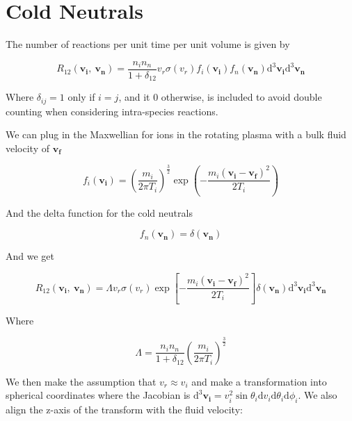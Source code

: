 \documentclass[11pt]{article}
\begin{document}
\section{Cold Neutrals}

The number of reactions per unit time per unit volume is given by 

\begin{equation}
	R_{12} (\mathbf{v_i},\ \mathbf{v_n}) = \frac{n_i n_n}{1 + \delta_{12}} v_r \sigma(v_r) f_i(\mathbf{v_i}) f_n(\mathbf{v_n}) \mathrm{d}^3 \mathbf{v_i} \mathrm{d}^3 \mathbf{v_n}
\end{equation}

Where $\delta_{ij} = 1$ only if $i = j$, and it 0 otherwise, is included to avoid double counting when considering intra-species reactions.

We can plug in the Maxwellian for ions in the rotating plasma with a bulk fluid velocity of $\mathbf{v_f}$

\begin{equation}
	f_i(\mathbf{v_i}) = \left( \frac{m_i}{2 \pi T_i} \right)^{\frac{3}{2}} \exp \left( -\frac{m_i (\mathbf{v_i} - \mathbf{v_f})^2}{2 T_i} \right)  
\end{equation}

And the delta function for the cold neutrals

\begin{equation}
	f_n(\mathbf{v_n}) = \delta( \mathbf{v_n} )
\end{equation}

And we get 

\begin{equation}
	R_{12} (\mathbf{v_i},\ \mathbf{v_n}) = \Lambda v_r \sigma(v_r) \exp \left[ - \frac{m_i (\mathbf{v_i} - \mathbf{v_f})^2}{2 T_i} \right] \delta( \mathbf{v_n} ) \mathrm{d}^3 \mathbf{v_i} \mathrm{d}^3 \mathbf{v_n}
\end{equation}

Where

\begin{equation}
	\Lambda = \frac{n_i n_n}{1 + \delta_{12}} \left( \frac{m_i}{2 \pi T_i} \right)^{\frac{3}{2}} 
\end{equation}

We then make the assumption that $v_r \approx v_i$ and make a transformation into spherical coordinates where the Jacobian is $\mathrm{d}^3 \mathbf{v_i} = v_i^2 \sin \theta_i \mathrm{d} v_i \mathrm{d} \theta_i \mathrm{d} \phi_i$. We also align the z-axis of the transform with the fluid velocity:
\end{document}
